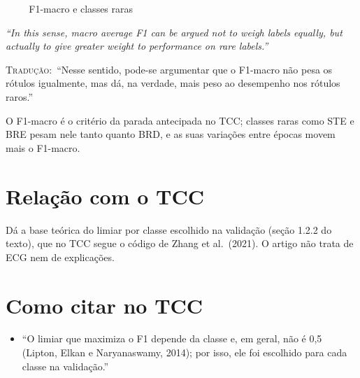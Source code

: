 \documentclass[11pt,a4paper]{article}
\newcommand{\pagechip}[1]{{\setlength{\fboxsep}{1.5pt}\colorbox{cAcc}{\textcolor{white}{\scriptsize\texttt{#1}}}}}
\newenvironment{origquote}{\par\itshape\small}{\par}
\newenvironment{tradquote}{\par\small\textsc{Tradução:}\ }{\par}
\newcommand{\explab}[1]{\par\smallskip{\small\color{cAcc}\textbf{\MakeUppercase{#1}}}\par}
\begin{document}
\begin{citacard}{\pagechip{p. 2} F1-macro e classes raras}
\begin{origquote}“In this sense, macro average F1 can be argued not to weigh labels equally, but actually to give greater weight to performance on rare labels.”\end{origquote}
\begin{tradquote}“Nesse sentido, pode-se argumentar que o F1-macro não pesa os rótulos igualmente, mas dá, na verdade, mais peso ao desempenho nos rótulos raros.”\end{tradquote}
\explab{Explicação}
O F1-macro é o critério da parada antecipada no TCC; classes raras como STE e BRE pesam nele tanto quanto BRD, e as suas variações entre épocas movem mais o F1-macro.
\end{citacard}

\section{Relação com o TCC}
Dá a base teórica do limiar por classe escolhido na validação (seção 1.2.2 do texto), que no TCC segue o código de Zhang et al.\ (2021). O artigo não trata de ECG nem de explicações.

\section{Como citar no TCC}
\begin{itemize}
\item ``O limiar que maximiza o F1 depende da classe e, em geral, não é 0,5 (Lipton, Elkan e Naryanaswamy, 2014); por isso, ele foi escolhido para cada classe na validação.''
\end{itemize}
\end{document}
